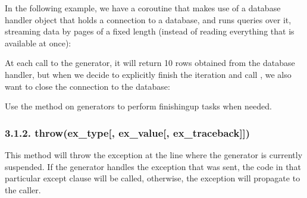 \documentclass[a4paper,10pt,english]{sphinxmanual}
\begin{document}
In the following example, we have a coroutine that makes use of a database handler object
that holds a connection to a database, and runs queries over it, streaming data by pages of a
fixed length (instead of reading everything that is available at once):

\begin{sphinxVerbatim}[commandchars=\\\{\}]
 
         
             
     
\end{sphinxVerbatim}

At each call to the generator, it will return 10 rows obtained from the database handler, but
when we decide to explicitly finish the iteration and call , we also want to close the
connection to the database:

\begin{sphinxVerbatim}[commandchars=\\\{\}]
  
\end{sphinxVerbatim}

Use the  method on generators to perform finishing\sphinxhyphen{}up tasks
when needed.


\subsubsection{3.1.2. throw(ex\_type{[}, ex\_value{[}, ex\_traceback{]}{]})}
\label{\detokenize{chapters/7_generators/index:throw-ex-type-ex-value-ex-traceback}}
This method will throw the exception at the line where the generator is currently
suspended. If the generator handles the exception that was sent, the code in that
particular except clause will be called, otherwise, the exception will propagate to the
caller.
\end{document}
